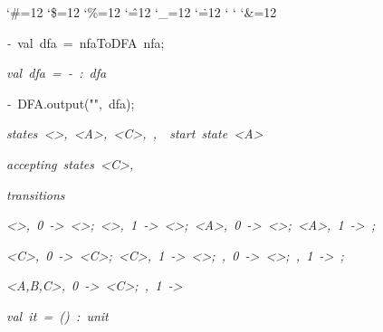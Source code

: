 \begin{list}{}
{\setlength{\leftmargin}{\leftmargini}
\setlength{\rightmargin}{0cm}
\setlength{\itemindent}{0cm}
\setlength{\listparindent}{0cm}
\setlength{\itemsep}{0cm}
\setlength{\parsep}{0cm}
\setlength{\labelsep}{0cm}
\setlength{\labelwidth}{0cm}
\catcode`\#=12
\catcode`\$=12
\catcode`\%=12
\catcode`\^=12
\catcode`\_=12
\catcode`\.=12
\catcode`
\catcode`
\catcode`\&=12
\ttfamily}
\small
\item[]\textsl{-\ }val\ dfa\ =\ nfaToDFA\ nfa;
\item[]\textsl{val\ dfa\ =\ -\ :\ dfa}
\item[]\textsl{-\ }DFA.output("",\ dfa);
\item[]\textsl{states\ <>,\ <A>,\ <C>,\ <A,B>,\ <A,B,C>\ start\ state\ <A>}
\item[]\textsl{accepting\ states\ <C>,\ <A,B,C>}
\item[]\textsl{transitions}
\item[]\textsl{<>,\ 0\ ->\ <>;\ <>,\ 1\ ->\ <>;\ <A>,\ 0\ ->\ <>;\ <A>,\ 1\ ->\ <A,B>;}
\item[]\textsl{<C>,\ 0\ ->\ <C>;\ <C>,\ 1\ ->\ <>;\ <A,B>,\ 0\ ->\ <>;\ <A,B>,\ 1\ ->\ <A,B,C>;}
\item[]\textsl{<A,B,C>,\ 0\ ->\ <C>;\ <A,B,C>,\ 1\ ->\ <A,B,C>}
\item[]\textsl{val\ it\ =\ ()\ :\ unit}
\end{list}
